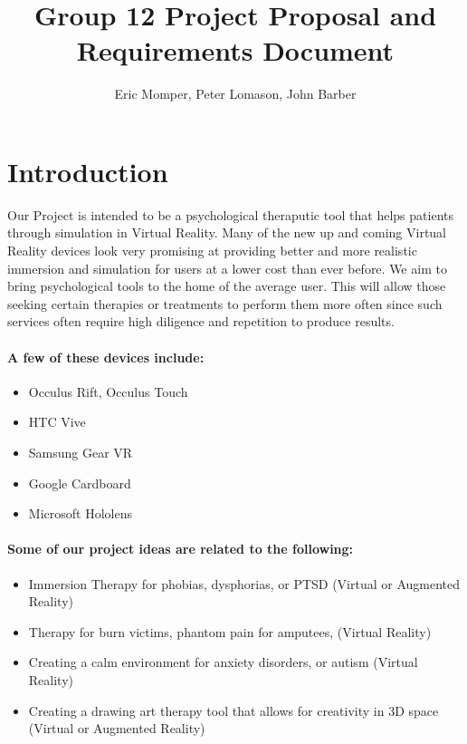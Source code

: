 \documentclass[a4paper,10pt]{article}
\title{Group 12 Project Proposal and Requirements Document}
\author{Eric Momper, Peter Lomason, John Barber}
\begin{document}
	
	\maketitle
	
	\pagebreak
	\tableofcontents
	\pagebreak
	
	\section{Introduction}
	Our Project is intended to be a psychological theraputic tool that helps patients through simulation in Virtual Reality.
	Many of the new up and coming Virtual Reality devices look very promising at providing better and more realistic immersion and simulation for users at a lower cost than ever before. We aim to bring psychological tools to the home of the average user. This will allow those seeking certain therapies or treatments to perform them more often since such services often require high diligence and repetition to produce results.
	\\
	\paragraph{A few of these devices include:}
	\begin{itemize}
		\item Occulus Rift, Occulus Touch
		\item HTC Vive
		\item Samsung Gear VR
		\item Google Cardboard
		\item Microsoft Hololens
	\end{itemize}
	
	\paragraph{ Some of our project ideas are related to the following:}
	\begin{itemize}
		\item ​Immersion Therapy for phobias, dysphorias, or PTSD (Virtual or Augmented Reality)
		\item Therapy for burn victims, phantom pain for amputees,  (Virtual Reality)
		\item Creating a calm environment for  anxiety disorders, or autism (Virtual Reality)
		\item Creating a drawing art therapy tool that allows for creativity in 3D space (Virtual or Augmented Reality)
	\end{itemize}
	
\end{document}
